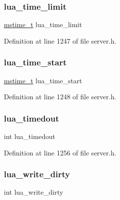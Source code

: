 \subsubsection{\texorpdfstring{lua\+\_\+time\+\_\+limit}{lua\_time\_limit}}
{\footnotesize\ttfamily \hyperlink{redismodule_8h_a652ae61e2475bc8957454534544968fc}{mstime\+\_\+t} lua\+\_\+time\+\_\+limit}



Definition at line 1247 of file server.\+h.

\mbox{\label{structredis_server_a9a42f59c5d930ed9816e67c3feb38807}} 
\subsubsection{\texorpdfstring{lua\+\_\+time\+\_\+start}{lua\_time\_start}}
{\footnotesize\ttfamily \hyperlink{redismodule_8h_a652ae61e2475bc8957454534544968fc}{mstime\+\_\+t} lua\+\_\+time\+\_\+start}



Definition at line 1248 of file server.\+h.

\mbox{\label{structredis_server_afce7261d2fd1519a835614d28df5afb5}} 
\subsubsection{\texorpdfstring{lua\+\_\+timedout}{lua\_timedout}}
{\footnotesize\ttfamily int lua\+\_\+timedout}



Definition at line 1256 of file server.\+h.

\mbox{\label{structredis_server_a74bf8a5fcf2bb65e2efc4d6b8a9085da}} 
\subsubsection{\texorpdfstring{lua\+\_\+write\+\_\+dirty}{lua\_write\_dirty}}
{\footnotesize\ttfamily int lua\+\_\+write\+\_\+dirty}



